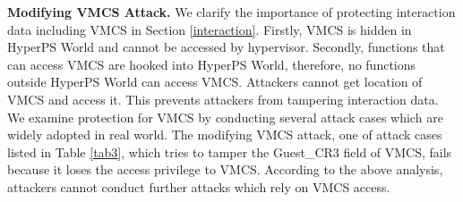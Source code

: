 \documentclass[conference]{IEEEtran}
\begin{document}


\textbf{Modifying VMCS Attack.}
We clarify the importance of protecting interaction data including VMCS in Section \ref{interaction}.
 Firstly, VMCS is hidden in HyperPS World and cannot be accessed by hypervisor. Secondly, functions that can access VMCS are hooked into HyperPS World, therefore, no functions outside HyperPS World can access VMCS. Attackers cannot get location of VMCS and access it. This prevents attackers from tampering interaction data. We examine protection for VMCS by conducting several attack cases which are widely adopted in real world. 
The modifying VMCS attack, one of attack cases listed in Table \ref{tab3}, which tries to tamper the Guest\_CR3 field of VMCS, fails because it loses the access privilege to VMCS. According to the above analysis, attackers cannot conduct further attacks which rely on VMCS access.


\end{document}
